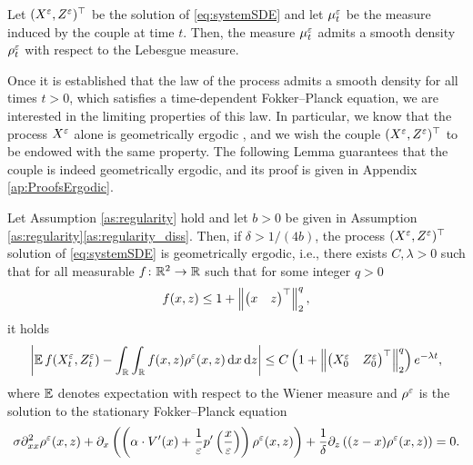 \documentclass[10pt]{article}
\begin{document}
\begin{lemma}\label{lem:density} Let $(X^\varepsilon, Z^\varepsilon)^\top$ be the solution of \eqref{eq:systemSDE} and let $\mu^\varepsilon_t$ be the measure induced by the couple at time $t$. Then, the measure $\mu^\varepsilon_t$ admits a smooth density $\rho^\varepsilon_t$ with respect to the Lebesgue measure.
\end{lemma}


Once it is established that the law of the process admits a smooth density for all times $t>0$, which satisfies a time-dependent Fokker--Planck equation, we are interested in the limiting properties of this law. In particular, we know that the process $X^\varepsilon$ alone is geometrically ergodic \cite[Theorem 4.4]{MSH02}, and we wish the couple $(X^\varepsilon, Z^\varepsilon)^\top$ to be endowed with the same property. The following Lemma guarantees that the couple is indeed geometrically ergodic, and its proof is given in Appendix \ref{ap:ProofsErgodic}.

\begin{lemma}\label{lem:ergodicity} Let Assumption \ref{as:regularity} hold and let $b > 0$ be given in Assumption \ref{as:regularity}\ref{as:regularity_diss}. Then, if $\delta > 1/(4b)$, the process $(X^\varepsilon, Z^\varepsilon)^\top$ solution of \eqref{eq:systemSDE} is geometrically ergodic, i.e., there exists $C, \lambda > 0$ such that for all measurable $f\colon \mathbb{R}^2\to \mathbb{R}$ such that for some integer $q > 0$ 
	\begin{equation}
		f(x, z) \leq 1 + \left\|\begin{pmatrix} x & z \end{pmatrix}^\top\right\|_2^q,
	\end{equation}
	it holds
	\begin{equation}
		\left\lvert\operatorname{\mathbb{E}} f(X^\varepsilon_t, Z^\varepsilon_t) - \int_{\mathbb{R}}\int_{\mathbb{R}} f(x, z) \rho^\varepsilon(x, z) \,\mathrm{d} x \,\mathrm{d} z\right\rvert \leq C\left(1 + \left\|\begin{pmatrix} X^\varepsilon_0 & Z^\varepsilon_0 \end{pmatrix}^\top\right\|_2^q \right)e^{-\lambda t},
	\end{equation}
	where $\operatorname{\mathbb{E}}$ denotes expectation with respect to the Wiener measure and $\rho^\varepsilon$ is the solution to the stationary Fokker--Planck equation
	\begin{equation}
	\label{eq:FPsystem}
	\sigma \partial^2_{xx} \rho^\varepsilon(x,z) +  \partial_x \left( \left( \alpha \cdot V'(x) + \frac{1}{\varepsilon} p' \left ( \frac{x}{\varepsilon} \right ) \right ) \rho^\varepsilon(x,z) \right) + \frac{1}{\delta} \partial_z \left((z - x) \rho^\varepsilon(x,z)\right) = 0.
	\end{equation}
\end{lemma}
\end{document}
